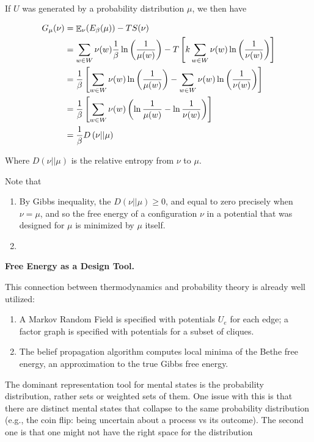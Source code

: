 \documentclass{article}
\begin{document}
	If $U$ was generated by a probability distribution $\mu$, we then have
	
	\begin{align*}
		G_\mu(\nu) &= {\mathop{\mathbb E}}_\nu( E_\beta(\mu) )  - T S(\nu) \\
		&= \sum_{w \in W}\nu(w) \frac{1}{\beta} \ln \left(\frac{1}{\mu(w)}\right) - T \left[k \sum_{w \in W} \nu(w) \ln \left(\frac{1}{\nu(w)}\right)\right]\\
		&=  \frac{1}{\beta}\left[\sum_{w \in W}\nu(w) \ln \left(\frac{1}{\mu(w)}\right) - \sum_{w \in W} \nu(w) \ln \left(\frac{1}{\nu(w)}\right)\right]\\
		&=  \frac{1}{\beta}\left[\sum_{w \in W}\nu(w) \left(\ln \frac{1}{\mu(w)} - \ln \frac{1}{\nu(w)}\right)\right]\\
		&= \frac{1}{\beta} D \left(\nu || \mu \right)
	\end{align*}

	Where $D(\nu || \mu)$ is the relative entropy from $\nu$ to $\mu$. 
	
	Note that \todo{}
	\begin{enumerate}
		\item By Gibbs inequality, the $D(\nu || \mu) \geq 0$, and equal to zero precisely when $\nu = \mu$, and so the free energy of a configuration $\nu$ in a potential that was designed for $\mu$ is minimized by $\mu$ itself.
		
		\item 
	\end{enumerate}

	
	


	
	\textbf{Free Energy as a Design Tool.}
	
	This connection between thermodynamics and probability theory is already well utilized:
	\begin{enumerate}
		\item A Markov Random Field is specified with potentials $U_e$ for each edge; a factor graph is specified with potentials for a subset of cliques.
		\item The belief propagation algorithm computes local minima of the Bethe free energy, an approximation to the true Gibbs free energy.
	\end{enumerate}


	The dominant representation tool for mental states is the probability distribution, rather sets or weighted sets of them. %
	One issue with this is that there are distinct mental states that collapse to the same probability distribution (e.g., the coin flip: being uncertain about a process vs its outcome). The second one is that one might not have the right space for the distribution
	
\end{document}
